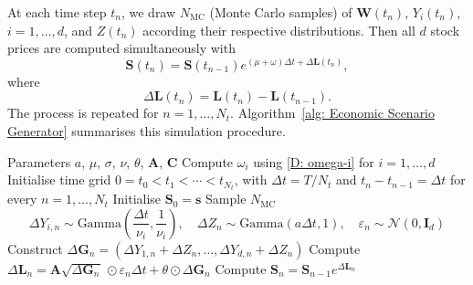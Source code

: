 At each time step $t_n$, we draw $N_{\text{MC}}$ (Monte Carlo samples) of $\mathbf{W}(t_n)$, $Y_i(t_n)$, $i=1,\ldots, d$, and $Z(t_n)$ according their respective distributions. Then all $d$ stock prices are computed simultaneously with
\begin{equation}
    \mathbf S(t_{n}) = \mathbf S(t_{n-1})e^{(\mu + \omega) \Delta t + \Delta \mathbf L(t_n)},
    \label{D: simulation of d stocks}
\end{equation}
where 
\begin{equation*}
    \Delta \mathbf L(t_n) = \mathbf{L}(t_{n}) - \mathbf{L}(t_{n-1}). 
\end{equation*}
The process is repeated for $n=1, \ldots, N_t$. Algorithm~\ref{alg: Economic Scenario Generator} summarises this simulation procedure. 
\begin{algorithm}[H]
\caption{Simulation procedure of $d$-correlated stocks via multivariate subordination}
\label{alg: Economic Scenario Generator}
\begin{algorithmic}[1]
\REQUIRE Parameters $a$, $\mu$, $\sigma$, $\nu$, $\theta$, $\mathbf{A}$, $\mathbf{C}$
\STATE Compute $\omega_i$ using \eqref{D: omega-i} for $i=1, \ldots, d$
\STATE Initialise time grid $0=t_0 < t_1 < \cdots < t_{N_t}$, with $\Delta t = T/N_t$ and $t_n-t_{n-1} = \Delta t$ for every $n=1,\ldots, N_t$
\STATE Initialise $\mathbf{S}_0=\mathbf{s}$
    \STATE Sample $N_{\text{MC}}$
    \begin{equation*}
        \Delta Y_{i,n} \sim \text{Gamma}\left(\frac{\Delta t}{\nu_i}, \frac{1}{\nu_i}\right), \quad \Delta Z_n \sim \text{Gamma} \left(a \Delta t,1\right), \quad \varepsilon_n \sim \mathcal{N}(0,\mathbf{I}_d)
    \end{equation*}
    \STATE Construct $\Delta \mathbf{G}_n = (\Delta Y_{1,n} + \Delta Z_n, \ldots, \Delta Y_{d,n} + \Delta Z_n)$
    \STATE Compute $\Delta \mathbf L_n = \mathbf A \sqrt{\Delta \mathbf{G}_n} \, \odot \varepsilon_n \Delta t + \theta \odot\Delta \mathbf{G}_n$
    \STATE Compute $\mathbf{S}_n = \mathbf{S}_{n-1}e^{\Delta \mathbf L_n}$
\ENDFOR
\end{algorithmic}
\end{algorithm}